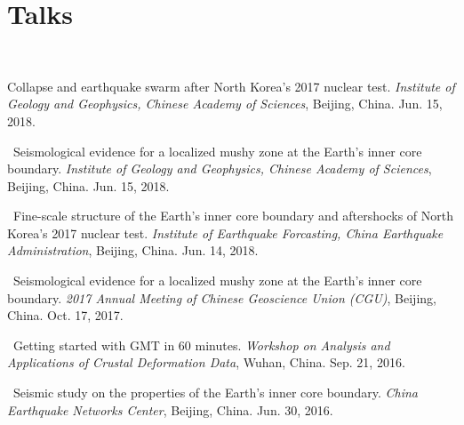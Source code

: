\section*{Talks}
\begin{etaremune}
\item
    \Xiao\
    
    Collapse and earthquake swarm after North Korea's 2017 nuclear test.
    \textit{Institute of Geology and Geophysics, Chinese Academy of Sciences}, Beijing, China.
    Jun. 15, 2018.
\item
    \Tian\
    Seismological evidence for a localized mushy zone at the Earth's inner core boundary.
    \textit{Institute of Geology and Geophysics, Chinese Academy of Sciences}, Beijing, China.
    Jun. 15, 2018.
    \invited
\item
    \Tian\
    Fine-scale structure of the Earth's inner core boundary and aftershocks of North Korea's 2017 nuclear test.
    \textit{Institute of Earthquake Forcasting, China Earthquake Administration}, Beijing, China.
    Jun. 14, 2018.
\item
    \Tian\
    Seismological evidence for a localized mushy zone at the Earth's inner core boundary.
    \textit{2017 Annual Meeting of Chinese Geoscience Union (CGU)}, Beijing, China.
    Oct. 17, 2017.
    \invited
\item
    \Tian\
    Getting started with GMT in 60 minutes.
    \textit{Workshop on Analysis and Applications of Crustal Deformation Data}, Wuhan, China.
    Sep. 21, 2016.
    \invited
\item
    \Tian\
    Seismic study on the properties of the Earth's inner core boundary.
    \textit{China Earthquake Networks Center}, Beijing, China.
    Jun. 30, 2016.
    \invited
\end{etaremune}
